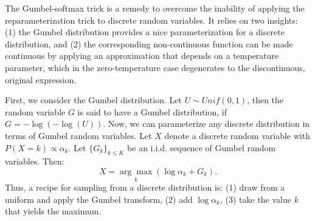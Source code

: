 \documentclass[11pt]{article}
\begin{document}
The Gumbel-softmax trick \cite{jang2016categorical} is a remedy to overcome the inability of applying the reparameterization trick to discrete random variables. It relies on two insights: (1) the Gumbel distribution provides a nice parameterization for a discrete distribution, and (2) the corresponding non-continuous function can be made continuous by applying an approximation that depends on a temperature parameter, which in the zero-temperature case degenerates to the discontinuous, original expression.

First, we consider the Gumbel distribution. Let $U\sim Unif(0,1)$, then the random variable $G$ is said to have a Gumbel distribution, if $G = -\log(-\log(U))$. Now, we can parameterize any discrete distribution in terms of Gumbel random variables. Let $X$ denote a discrete random variable with $P(X=k) \propto \alpha_k$. Let $\{G_k\}_{k \leq K}$ be an i.i.d. sequence of Gumbel random variables. Then:
\begin{equation}
X = \underset{k}{\arg\max}(\log\alpha_k + G_k).
\label{eq:gumbel}
\end{equation}
Thus, a recipe for sampling from a discrete distribution is: (1) draw from a uniform and apply the Gumbel transform, (2) add $\log\alpha_k$, (3) take the value $k$ that yields the maximum.
\end{document}

